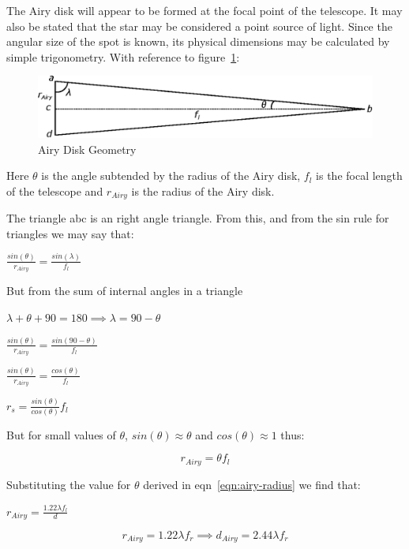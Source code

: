 \documentclass[11pt]{article}
\begin{document}
The Airy disk will appear to be formed at the focal point of the telescope. It may also be stated that the star may be considered a point source of light.  Since the angular size of the spot is known, its physical dimensions may be calculated by simple trigonometry. With reference to figure~\ref{fig:spot_geometry}:


\begin{figure}[htb]
	\begin{center}
		\includegraphics[]{./images/spot_size_figure.eps}
		\caption{Airy Disk Geometry}
		\label{fig:spot_geometry}
	\end{center}
\end{figure}


Here $\theta$ is the angle subtended by the radius of the Airy disk, $f_{l}$ is the focal length of the telescope and $r_{Airy}$ is the radius of the Airy disk.

The triangle abc is an right angle triangle.  From this, and from the sin rule for triangles we may say that:

\LARGE
$\frac{sin(\theta)}{r_{Airy}} = \frac{sin(\lambda)}{f_{l}}$
\large

But from the sum of internal angles in a triangle

$\lambda+\theta+90=180 \implies \lambda=90-\theta$

\LARGE
$\frac{sin(\theta)}{r_{Airy}} = \frac{sin(90-\theta)}{f_{l}}$

\LARGE
$\frac{sin(\theta)}{r_{Airy}} = \frac{cos(\theta)}{f_{l}}$

\LARGE
$r_{s}=\frac{sin(\theta)}{cos(\theta)} f_{l}$

\large
But for small values of $\theta$, $sin(\theta)\approx\theta$ and $cos(\theta)\approx 1$ thus:

\Large
\begin{equation}
\label{eqn:spot-startpoint}
r_{Airy}=\theta f_{l}
\end{equation}

\large
Substituting the value for $\theta$ derived in eqn~\ref{eqn:airy-radius} we find that:

\LARGE
$r_{Airy}=\frac{1.22\lambda f_{l}}{d} $

\Large
\begin{equation}
\label{eqn:spot-diameter}
r_{Airy}=1.22\lambda f_{r} \implies d_{Airy}=2.44\lambda f_{r}
\end{equation}
\end{document}
